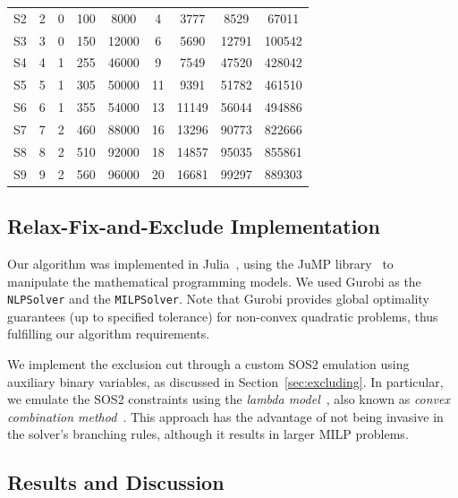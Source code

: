 \documentclass[pdflatex,sn-mathphys-num]{sn-jnl}%
\newcommand{\new}[1]{#1}
\begin{document}
\begin{table}[ht]
{\begin{tabular}{c  cc  cc  cc  c  c}
S2 & 2 & 0  & 100  &  8000 & 4  &  3777 &  8529 & 67011 \\
S3 & 3 & 0  & 150  & 12000 & 6  &  5690 & 12791 & 100542 \\
S4 & 4 & 1  & 255  & 46000 & 9  &  7549 & 47520 & 428042 \\
S5 & 5 & 1  & 305  & 50000 & 11 &  9391 & 51782 & 461510 \\
S6 & 6 & 1  & 355  & 54000 & 13 & 11149 & 56044 & 494886 \\
S7 & 7 & 2  & 460  & 88000 & 16 & 13296 & 90773 & 822666 \\
S8 & 8 & 2  & 510  & 92000 & 18 & 14857 & 95035 & 855861 \\
S9 & 9 & 2  & 560  & 96000 & 20 & 16681 & 99297 & 889303 \\
\bottomrule
\end{tabular}
}
\end{table}

\subsection{Relax-Fix-and-Exclude Implementation}

Our algorithm was implemented in Julia~\cite{Julia-2017}, using the JuMP library~\cite{Lubin2023} to manipulate the mathematical programming models.
We used Gurobi as the \texttt{NLPSolver} and the \texttt{MILPSolver}.
Note that Gurobi provides global optimality guarantees (up to specified tolerance) for non-convex quadratic problems, thus fulfilling our algorithm requirements.

We implement the exclusion cut through a custom SOS2 emulation using auxiliary binary variables, as discussed in Section~\ref{sec:excluding}.
\new{In particular, we emulate the SOS2 constraints using the \emph{lambda model}~\citep{dantzigSignificanceSolvingLinear1960}, also known as \emph{convex combination method}~\citep{vielma2010modeling}.}
This approach has the advantage of not being invasive in the solver's branching rules, although it results in larger MILP problems.

\subsection{Results and Discussion}
\end{document}
